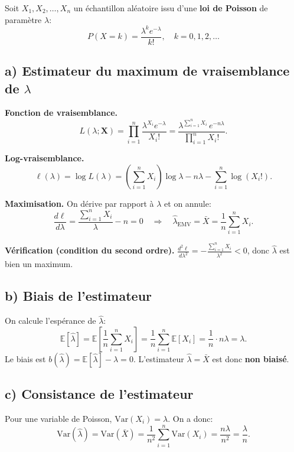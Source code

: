 \documentclass[12pt,letterpaper]{article}
\begin{document}
Soit $X_1, X_2, \ldots, X_n$ un échantillon aléatoire issu d'une \textbf{loi de Poisson} de paramètre $\lambda$:
\[
P(X = k) = \frac{\lambda^k e^{-\lambda}}{k!}, \quad k = 0, 1, 2, \ldots
\]

\subsection{a) Estimateur du maximum de vraisemblance de $\lambda$} %

\textbf{Fonction de vraisemblance.}
\[
L(\lambda; \mathbf{X}) = \prod_{i=1}^{n} \frac{\lambda^{X_i} e^{-\lambda}}{X_i!}
= \frac{\lambda^{\sum_{i=1}^n X_i} \, e^{-n\lambda}}{\prod_{i=1}^n X_i!}.
\]

\textbf{Log-vraisemblance.}
\[
\ell(\lambda) = \log L(\lambda) = \left(\sum_{i=1}^n X_i\right) \log\lambda - n\lambda - \sum_{i=1}^n \log(X_i!).
\]

\textbf{Maximisation.} On dérive par rapport à $\lambda$ et on annule:
\[
\frac{d\ell}{d\lambda} = \frac{\sum_{i=1}^n X_i}{\lambda} - n = 0
\quad \Longrightarrow \quad
\boxed{\hat{\lambda}_{\text{EMV}} = \bar{X} = \frac{1}{n}\sum_{i=1}^n X_i.}
\]

\textbf{Vérification (condition du second ordre).}
$\displaystyle \frac{d^2\ell}{d\lambda^2} = -\frac{\sum_{i=1}^n X_i}{\lambda^2} < 0$,
donc $\hat{\lambda}$ est bien un maximum.

\subsection{b) Biais de l'estimateur} %

On calcule l'espérance de $\hat{\lambda}$:
\[
\mathbb{E}[\hat{\lambda}]
= \mathbb{E}\!\left[\frac{1}{n}\sum_{i=1}^n X_i\right]
= \frac{1}{n}\sum_{i=1}^n \mathbb{E}[X_i]
= \frac{1}{n} \cdot n\lambda
= \lambda.
\]
Le biais est $b(\hat{\lambda}) = \mathbb{E}[\hat{\lambda}] - \lambda = 0$.
L'estimateur $\hat{\lambda} = \bar{X}$ est donc \textbf{non biaisé}.

\subsection{c) Consistance de l'estimateur} %

Pour une variable de Poisson, $\text{Var}(X_i) = \lambda$. On a donc:
\[
\text{Var}(\hat{\lambda})
= \text{Var}(\bar{X})
= \frac{1}{n^2}\sum_{i=1}^n \text{Var}(X_i)
= \frac{n\lambda}{n^2}
= \frac{\lambda}{n}.
\]
\end{document}
